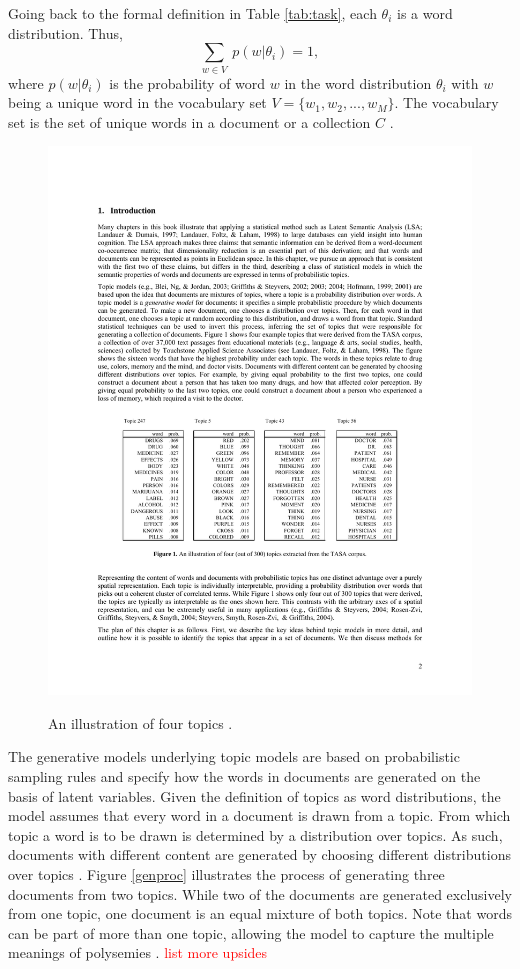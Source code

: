 \documentclass[11pt,a4paper,english,oneside]{book}
\numberwithin{equation}{chapter}
\begin{document}
Going back to the formal definition in Table \ref{tab:task}, each $\theta_i$ is a word distribution. Thus,
$$
\underset{w \in V}{\sum} \ p(w | \theta_i) = 1,
$$
where $p(w | \theta_i)$ is the probability of word $w$ in the word distribution $\theta_i$ with $w$ being a unique word in the vocabulary set $V = \{w_1, w_2, ..., w_M\}$. The vocabulary set is the set of unique words in a document or a collection $C$ \cite[pp.~338]{Zhai.2016}.

\begin{figure}
	\caption{An illustration of four topics \cite[p.2]{Steyvers(2007)}.}
	\centering
	\includegraphics[scale=1]{Images/SteyversGriffithsTopics.pdf}
	\label{fourtopics}
\end{figure}

The generative models underlying topic models are based on probabilistic sampling rules and specify how the words in documents are generated on the basis of latent variables. Given the definition of topics as word distributions, the model assumes that every word in a document is drawn from a topic. From which topic a word is to be drawn is determined by a distribution over topics. As such, documents with different content are generated by choosing different distributions over topics \cite[~p. 2--3]{Steyvers(2007)}. Figure \ref{genproc} illustrates the process of generating three documents from two topics. While two of the documents are generated exclusively from one topic, one document is an equal mixture of both topics. Note that words can be part of more than one topic, allowing the model to capture the multiple meanings of polysemies \cite[~p. 2--3]{Steyvers(2007)}.  \textcolor{red}{list more upsides}
\end{document}
